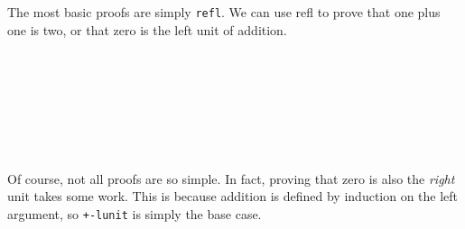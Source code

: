 The most basic proofs are simply \texttt{refl}. We can use refl to prove that one plus one is two,
or that zero is the left unit of addition.
\begin{code}%
\>[0]\<%
\\
\>[0]\AgdaFunction{\AgdaUnderscore{}}\AgdaSpace{}%
\AgdaSymbol{:}\AgdaSpace{}%
\AgdaSymbol{(}\AgdaSpace{}%
\AgdaSymbol{)}\AgdaSpace{}%
\AgdaOperator{\AgdaFunction{+}}\AgdaSpace{}%
\AgdaSymbol{(}\AgdaSpace{}%
\AgdaSymbol{)}\AgdaSpace{}%
\AgdaSpace{}%
\AgdaSpace{}%
\AgdaSymbol{(}\AgdaSpace{}%
\AgdaSymbol{)}\<%
\\
\>[0]\AgdaSymbol{\AgdaUnderscore{}}\AgdaSpace{}%
\AgdaSymbol{=}\AgdaSpace{}%
\<%
\\
%
\\[\AgdaEmptyExtraSkip]%
\>[0]\<%
\\
\>[0]\AgdaSpace{}%
\AgdaSymbol{:}\AgdaSpace{}%
\AgdaSpace{}%
\AgdaSymbol{\{}\AgdaSymbol{\}}\AgdaSpace{}%
\AgdaSpace{}%
\AgdaSpace{}%
\AgdaOperator{\AgdaFunction{+}}\AgdaSpace{}%
\AgdaSpace{}%
\AgdaSpace{}%
\<%
\\
\>[0]\AgdaSpace{}%
\AgdaSymbol{=}\AgdaSpace{}%
\<%
\end{code}
Of course, not all proofs are so simple. In fact, proving that zero is also the \emph{right} unit takes some work.
This is because addition is defined by induction on the left argument, so \texttt{+-lunit} is simply the base case.
\begin{code}%
\>[0]\AgdaSpace{}%
\AgdaSymbol{:}\AgdaSpace{}%
\AgdaSpace{}%
\AgdaSymbol{\{}\AgdaSymbol{\}}\AgdaSpace{}%
\AgdaSpace{}%
\AgdaSpace{}%
\AgdaOperator{\AgdaFunction{+}}\AgdaSpace{}%
\AgdaSpace{}%
\AgdaSpace{}%
\<%
\\
\>[0]\AgdaSpace{}%
\AgdaSymbol{\{}\AgdaSymbol{\}}\AgdaSpace{}%
\AgdaSymbol{=}\AgdaSpace{}%
\<%
\\
\>[0]\AgdaSpace{}%
\AgdaSymbol{\{}\AgdaSpace{}%
\AgdaSymbol{\}}\AgdaSpace{}%
\AgdaSymbol{=}\AgdaSpace{}%
\AgdaSpace{}%
\AgdaSpace{}%
\<%
\end{code}
